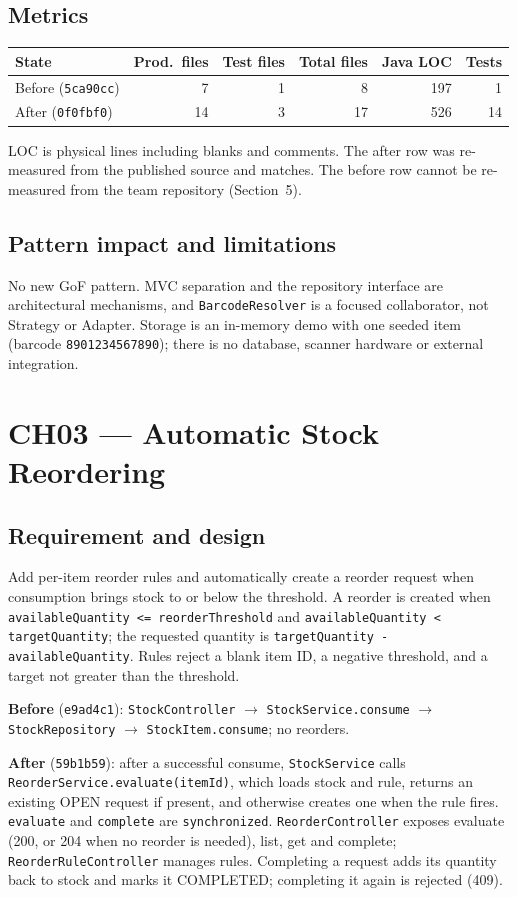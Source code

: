 \documentclass[11pt,a4paper]{article}
\newcommand{\code}[1]{\nolinkurl{#1}}
\begin{document}
\subsection{Metrics}
\begin{tabularx}{\linewidth}{@{}Yrrrrr@{}}
\toprule
State & Prod.\ files & Test files & Total files & Java LOC & Tests\\
\midrule
Before (\code{5ca90cc}) & 7 & 1 & 8 & 197 & 1\\
After (\code{0f0fbf0}) & 14 & 3 & 17 & 526 & 14\\
\bottomrule
\end{tabularx}
LOC is physical lines including blanks and comments. The after row was re-measured from the published source and matches. The before row cannot be re-measured from the team repository (Section~5).

\subsection{Pattern impact and limitations}
No new GoF pattern. MVC separation and the repository interface are architectural mechanisms, and \code{BarcodeResolver} is a focused collaborator, not Strategy or Adapter. Storage is an in-memory demo with one seeded item (barcode \code{8901234567890}); there is no database, scanner hardware or external integration.

\section{CH03 --- Automatic Stock Reordering}

\subsection{Requirement and design}
Add per-item reorder rules and automatically create a reorder request when consumption brings stock to or below the threshold. A reorder is created when \code{availableQuantity <= reorderThreshold} and \code{availableQuantity < targetQuantity}; the requested quantity is \code{targetQuantity - availableQuantity}. Rules reject a blank item ID, a negative threshold, and a target not greater than the threshold.

\textbf{Before} (\code{e9ad4c1}): \code{StockController} $\rightarrow$ \code{StockService.consume} $\rightarrow$ \code{StockRepository} $\rightarrow$ \code{StockItem.consume}; no reorders.

\textbf{After} (\code{59b1b59}): after a successful consume, \code{StockService} calls \code{ReorderService.evaluate(itemId)}, which loads stock and rule, returns an existing OPEN request if present, and otherwise creates one when the rule fires. \code{evaluate} and \code{complete} are \code{synchronized}. \code{ReorderController} exposes evaluate (200, or 204 when no reorder is needed), list, get and complete; \code{ReorderRuleController} manages rules. Completing a request adds its quantity back to stock and marks it COMPLETED; completing it again is rejected (409).
\end{document}
